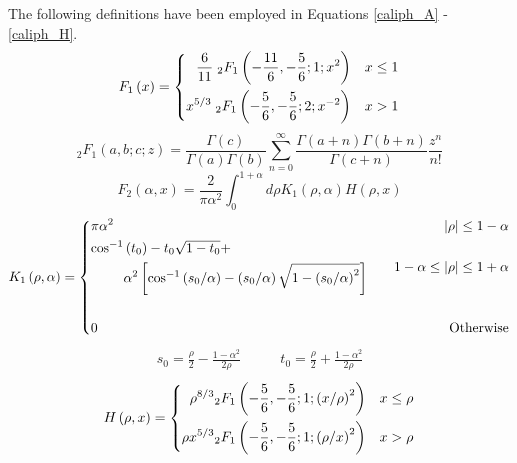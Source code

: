 The following definitions have been employed in Equations \ref{caliph_A} - \ref{caliph_H}.
\begin{equation}\label{F_1_eqn}
F_{1}\left(x\right) = 
\left\{
\begin{aligned}
\frac{6}{11}\; \vphantom{F}_{2}F_{1}\left(-\frac{11}{6}, -\frac{5}{6};1; x^{2}\right) & \quad x\le 1 \\
x^{5/3}\; \vphantom{F}_{2}F_{1}\left(-\frac{5}{6}, -\frac{5}{6};2; x^{-2}\right)        & \quad x>1
\end{aligned}
\right.
\end{equation}
\begin{equation}\label{2_F_2_eqn}
_2F_1(a,b;c;z) = \frac{\Gamma(c)}{\Gamma(a)\Gamma(b)} \sum_{n=0}^{\infty} 
\frac{\Gamma(a + n) \Gamma(b + n)}{\Gamma(c + n)} \frac{z^n}{n!}
\end{equation}
\begin{equation}\label{F_2_eqn}
F_{2}\left(\alpha, x\right) = \frac{2}{\pi \alpha^{2}} \int_{0}^{1+\alpha} d\rho K_{1}\left(\rho, \alpha\right)H\left(\rho, x\right)
\end{equation}
\begin{equation}\label{K_1_eqn}
K_{1}\left(\rho,\alpha\right) = 
\left\{
\begin{aligned}
&
\pi \alpha^{2} & \left\vert\rho\right\vert \le 1-\alpha \\
&
\begin{split}
\cos^{-1}&\left(t_{0}\right) - t_{0}\sqrt{1-t_{0}} + \\
&\alpha^{2}\left[\cos^{-1}\left(s_{0}/\alpha\right) - \left(s_{0}/\alpha\right)\sqrt{1-\left(s_{0}/\alpha\right)^{2}}\right] 
\end{split}
& \quad 1 - \alpha \le \left\vert\rho\right\vert  \le 1+\alpha \\
\\
& 0 & {\rm Otherwise}
\end{aligned}
\right.
\end{equation}
\begin{equation}\label{s0_t0_eqn}
\begin{aligned}
s_{0} = \frac{\rho}{2} - \frac{1 - \alpha^{2}}{2\rho} \quad & \quad t_{0} = \frac{\rho}{2} + \frac{1 - \alpha^{2}}{2\rho} 
\end{aligned}
\end{equation}
\begin{equation}\label{H_eqn}
H\left(\rho,x\right) = 
\left\{
\begin{aligned}
\rho^{8/3} \vphantom{F}_{2}F_{1}\left(-\frac{5}{6}, -\frac{5}{6};1; \left(x/\rho\right)^{2}\right)        & \quad x\le \rho \\
\rho x^{5/3} \vphantom{F}_{2}F_{1}\left(-\frac{5}{6}, -\frac{5}{6};1; \left(\rho/x\right)^{2}\right)        & \quad x > \rho
\end{aligned}
\right.
\end{equation}
